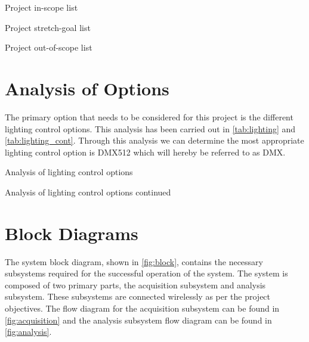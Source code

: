 \begin{table}[!ht]
    \caption{Project in-scope list}\label{tab:scope}
    \centering
    
\end{table}

\begin{table}[!ht]
    \caption{Project stretch-goal list}\label{tab:scope_stretch}
    \centering
    
\end{table}

\begin{table}[!ht]
    \caption{Project out-of-scope list}\label{tab:scope_out}
    \centering
    
\end{table}

\section{Analysis of Options}
The primary option that needs to be considered for this project is the different lighting control options.
This analysis has been carried out in \autoref{tab:lighting} and \autoref{tab:lighting_cont}.
Through this analysis we can determine the most appropriate lighting control option is DMX512
which will hereby be referred to as DMX.\@

\begin{table}[!ht]
    \caption{Analysis of lighting control options}\label{tab:lighting}
    \centering
    
\end{table}

\begin{table}[!ht]
    \caption{Analysis of lighting control options continued}\label{tab:lighting_cont}
    \centering
    
\end{table}

\section{Block Diagrams}
The system block diagram, shown in \autoref{fig:block}, contains the necessary subsystems required for the successful operation of the system.
The system is composed of two primary parts, the acquisition subsystem and analysis subsystem.
These subsystems are connected wirelessly as per the project objectives.
The flow diagram for the acquisition subsystem can be found in \autoref{fig:acquisition}
and the analysis subsystem flow diagram can be found in \autoref{fig:analysis}.

